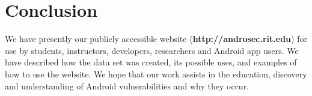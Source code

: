 \documentclass[journal,transmag]{IEEEtran}
\begin{document}
\section{Conclusion}
\label{sec: conclusion}
We have presently our publicly accessible website (\textbf{http://androsec.rit.edu}) for use by students, instructors, developers, researchers and Android app users. We have described how the data set was created, its possible uses, and examples of how to use the website. We hope that our work assists in the education, discovery and understanding of Android vulnerabilities and why they occur.




\balance



\end{document}
